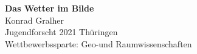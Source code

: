 \begin{titlepage}
    \begin{center}
        \huge{
            \vspace*{1cm}
            \textbf{Das Wetter im Bilde}
        }
        \vspace{1cm}
        \\
        \large{
            Konrad Gralher \\
            Jugendforscht 2021 Thüringen 
        }\\
        \vspace{1cm}
        \large{
            Wettbewerbssparte: Geo-und Raumwissenschaften
        }
        \vfill
        \tableofcontents{}
        
    \end{center}
\end{titlepage}
